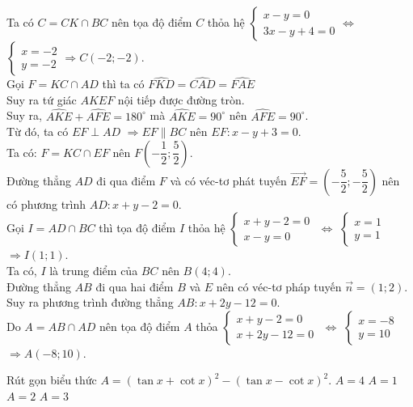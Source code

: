 \begin{ex}
{\begin{center}
		\end{center}
		Ta có $C=CK \cap BC$ nên tọa độ điểm $C$ thỏa hệ $\begin{cases} x-y=0 \\ 3x-y+4=0 \end{cases} \Leftrightarrow$ $\begin{cases} x=-2 \\ y=-2 \end{cases} \Rightarrow C(-2;-2)$.\\
			Gọi $F=KC\cap AD$ thì ta có  $\widehat{FKD}=\widehat{CAD}=\widehat{FAE}$\\
			Suy ra tứ giác $AKEF$ nội tiếp được đường tròn.\\
			Suy ra, $\widehat{AKE}+\widehat{AFE}=180^{\circ}$ mà $\widehat{AKE}=90^{\circ}$ nên $\widehat{AFE}=90^{\circ}$.\\
			Từ đó, ta có $EF\perp AD$ $\Rightarrow EF\parallel BC$ nên $EF: x-y+3=0$.\\
			Ta có: $F=KC\cap EF$ nên $F\left(-\dfrac{1}{2};\dfrac{5}{2}\right)$.\\
			Đường thẳng $AD$ đi qua điểm $F$ và có véc-tơ phát tuyến $\overrightarrow{EF}=\left(-\dfrac{5}{2};-\dfrac{5}{2}\right)$ nên có phương trình $AD:x+y-2=0$.\\
			Gọi $I=AD\cap BC$ thì tọa độ điểm $I$ thỏa hệ $\begin{cases} x+y-2=0 \\ x-y=0 \end{cases}$ $\Leftrightarrow$ $\begin{cases} x=1 \\ y=1 \end{cases}$ $\Rightarrow I(1;1)$.\\
			Ta có, $I$ là trung điểm của $BC$ nên $B(4;4)$.\\ Đường thẳng $AB$ đi qua hai điểm $B$ và $E$ nên có véc-tơ pháp tuyến $\vec{n}=(1;2)$.\\
			Suy ra phương trình đường thẳng $AB:x+2y-12=0$. \\
			Do $A=AB\cap AD$ nên tọa độ điểm $A$ thỏa $\begin{cases} x+y-2=0 \\ x+2y-12=0 \end{cases}$ $\Leftrightarrow$ $\begin{cases} x=-8 \\ y=10 \end{cases}$ $\Rightarrow A(-8;10)$.
	}
\end{ex}
 \begin{ex}%
Rút gọn biểu thức $A=(\tan x+\cot x)^2-(\tan x-\cot x)^2$.
\choice
{\True $A=4$}		{$A=1$}	{$A=2$}	{$A=3$}
	
\end{ex}
